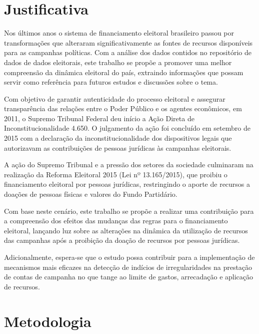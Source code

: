 \documentclass[
	12pt,				%
	openright,			%
	oneside,			%
	a4paper,			%
	english,			%
	french,				%
	spanish,			%
	brazil,				%
	]{abntex2}
\begin{document}
\chapter[Justificativa]{Justificativa}

Nos últimos anos o sistema de financiamento eleitoral brasileiro passou por transformações que alteraram significativamente as fontes de recursos disponíveis para as campanhas políticas. Com a análise dos dados contidos no repositório de dados de dados eleitorais, este trabalho se propõe a promover uma melhor compreensão da dinâmica eleitoral do país, extraindo informações que possam servir como referência para futuros estudos e discussões sobre o tema.

Com objetivo de garantir autenticidade do processo eleitoral e assegurar  transparência das relações entre o Poder Público e os agentes econômicos, em 2011, o Supremo Tribunal Federal deu início a Ação Direta de Inconstitucionalidade 4.650. O julgamento da ação foi concluído em setembro de 2015 com a declaração da inconstitucionalidade dos dispositivos legais que autorizavam as contribuições de pessoas jurídicas às campanhas eleitorais.

A ação do Supremo Tribunal e a pressão dos setores da sociedade culminaram na  realização da Reforma Eleitoral 2015 (Lei nº 13.165/2015), que proibiu o financiamento eleitoral por pessoas jurídicas, restringindo o aporte de recursos a doações de pessoas físicas e valores do Fundo Partidário.

Com base neste cenário, este trabalho se propõe a realizar uma contribuição para a compreensão dos efeitos das mudanças das regras para o financiamento eleitoral,  lançando luz sobre as alterações na dinâmica da utilização de recursos das campanhas após a proibição da doação de recursos por pessoas jurídicas.

Adicionalmente, espera-se que o estudo possa contribuir para a implementação de mecanismos mais eficazes na detecção de indícios de irregularidades na prestação de contas de campanha no que tange ao limite de gastos, arrecadação e aplicação de recursos.


\chapter[Metodologia]{Metodologia}
\end{document}
